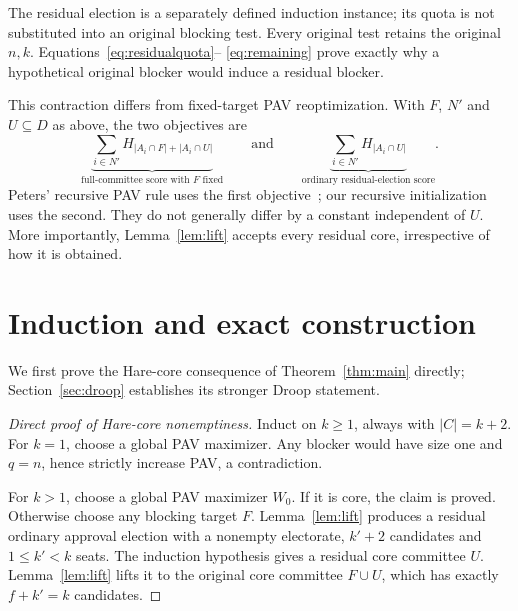 \documentclass[11pt]{article}
\begin{document}
The residual election is a separately defined induction instance; its
quota is not substituted into an original blocking test. Every original
test retains the original $n,k$. Equations~\eqref{eq:residualquota}--
\eqref{eq:remaining} prove exactly why a hypothetical original blocker
would induce a residual blocker.

This contraction differs from fixed-target PAV reoptimization. With
$F$, $N'$ and $U\subseteq D$ as above, the two objectives are
\[
 \underbrace{\sum_{i\in N'}H_{|A_i\cap F|+|A_i\cap U|}}
 _{\text{full-committee score with }F\text{ fixed}}
 \qquad\text{and}\qquad
 \underbrace{\sum_{i\in N'}H_{|A_i\cap U|}}
 _{\text{ordinary residual-election score}}.
\]
Peters' recursive PAV rule uses the first objective~\cite[Algorithm~1]{Peters2025};
our recursive initialization uses the second. They do not generally differ
by a constant independent of $U$. More importantly, Lemma~\ref{lem:lift}
accepts every residual core, irrespective of how it is obtained.

\section{Induction and exact construction}\label{sec:construction}
We first prove the Hare-core consequence of Theorem~\ref{thm:main}
directly; Section~\ref{sec:droop} establishes its stronger Droop statement.
\begin{proof}[Direct proof of Hare-core nonemptiness]
Induct on $k\ge1$, always with $|C|=k+2$. For $k=1$, choose a global
PAV maximizer. Any blocker would have size one and $q=n$, hence strictly
increase PAV, a contradiction.

For $k>1$, choose a global PAV maximizer $W_0$. If it is core, the claim
is proved. Otherwise choose any blocking target $F$. Lemma~\ref{lem:lift}
produces a residual ordinary approval election with a nonempty electorate,
$k'+2$ candidates and $1\le k'<k$ seats. The induction hypothesis gives
a residual core committee $U$. Lemma~\ref{lem:lift} lifts it to the
original core committee $F\cup U$, which has exactly $f+k'=k$ candidates.
\end{proof}
\end{document}
